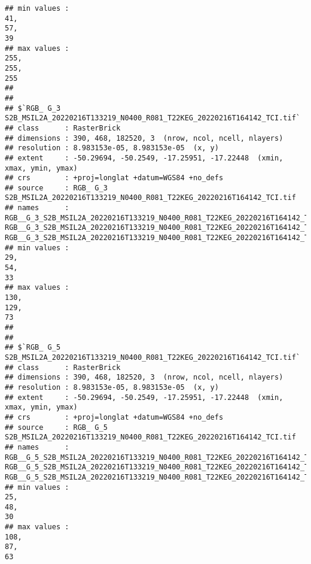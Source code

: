 \documentclass[
]{article}
\begin{document}
\begin{verbatim}
## min values :                                                                          41,                                                                          57,                                                                          39 
## max values :                                                                         255,                                                                         255,                                                                         255 
## 
## 
## $`RGB_ G_3 S2B_MSIL2A_20220216T133219_N0400_R081_T22KEG_20220216T164142_TCI.tif`
## class      : RasterBrick 
## dimensions : 390, 468, 182520, 3  (nrow, ncol, ncell, nlayers)
## resolution : 8.983153e-05, 8.983153e-05  (x, y)
## extent     : -50.29694, -50.2549, -17.25951, -17.22448  (xmin, xmax, ymin, ymax)
## crs        : +proj=longlat +datum=WGS84 +no_defs 
## source     : RGB_ G_3 S2B_MSIL2A_20220216T133219_N0400_R081_T22KEG_20220216T164142_TCI.tif 
## names      : RGB__G_3_S2B_MSIL2A_20220216T133219_N0400_R081_T22KEG_20220216T164142_TCI.1, RGB__G_3_S2B_MSIL2A_20220216T133219_N0400_R081_T22KEG_20220216T164142_TCI.2, RGB__G_3_S2B_MSIL2A_20220216T133219_N0400_R081_T22KEG_20220216T164142_TCI.3 
## min values :                                                                          29,                                                                          54,                                                                          33 
## max values :                                                                         130,                                                                         129,                                                                          73 
## 
## 
## $`RGB_ G_5 S2B_MSIL2A_20220216T133219_N0400_R081_T22KEG_20220216T164142_TCI.tif`
## class      : RasterBrick 
## dimensions : 390, 468, 182520, 3  (nrow, ncol, ncell, nlayers)
## resolution : 8.983153e-05, 8.983153e-05  (x, y)
## extent     : -50.29694, -50.2549, -17.25951, -17.22448  (xmin, xmax, ymin, ymax)
## crs        : +proj=longlat +datum=WGS84 +no_defs 
## source     : RGB_ G_5 S2B_MSIL2A_20220216T133219_N0400_R081_T22KEG_20220216T164142_TCI.tif 
## names      : RGB__G_5_S2B_MSIL2A_20220216T133219_N0400_R081_T22KEG_20220216T164142_TCI.1, RGB__G_5_S2B_MSIL2A_20220216T133219_N0400_R081_T22KEG_20220216T164142_TCI.2, RGB__G_5_S2B_MSIL2A_20220216T133219_N0400_R081_T22KEG_20220216T164142_TCI.3 
## min values :                                                                          25,                                                                          48,                                                                          30 
## max values :                                                                         108,                                                                          87,                                                                          63
\end{verbatim}
\end{document}
